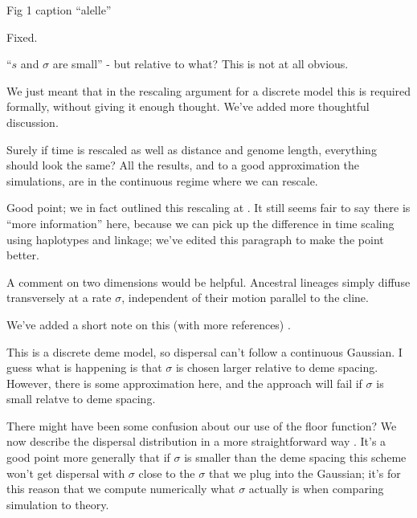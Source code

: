 \begin{point}{Fig 1 caption}
``alelle''
\end{point}

\reply
Fixed.

\begin{point}{\revref}
``$s$ and $\sigma$ are small'' - but relative to what?  This is not at all obvious.
\end{point}

\reply
We just meant that in the rescaling argument for a discrete model this is required formally,
without giving it enough thought.
We've added more thoughtful discussion.

\begin{point}{\revref}
Surely if time is rescaled as well as distance and genome length, everything should look the same?  
All the results, and to a good approximation the simulations, are in the continuous regime where we can rescale.
\end{point}

\reply
Good point; we in fact outlined this rescaling at .
It still seems fair to say there is ``more information'' here, because we can pick up the difference in time scaling
using haplotypes and linkage;
we've edited this paragraph to make the point better.

\begin{point}{}
A comment on two dimensions would be helpful.  
Ancestral lineages simply diffuse transversely at a rate $\sigma$, independent of their motion parallel to the cline.
\end{point}

\reply
We've added a short note on this (with more references) \revref.

\begin{point}{\revref}
This is a discrete deme model, so dispersal can't follow a continuous Gaussian. 
I guess what is happening is that $\sigma$ is chosen larger relative to deme spacing.  
However, there is some approximation here, and the approach will fail if $\sigma$ is small relatve to deme spacing.
\end{point}

\reply
There might have been some confusion about our use of the floor function?
We now describe the dispersal distribution in a more straightforward way \revref.
It's a good point more generally that if $\sigma$ is smaller than the deme spacing this scheme won't get dispersal with $\sigma$ close to the $\sigma$ that we plug into the Gaussian;
it's for this reason that we compute numerically what $\sigma$ actually is when comparing simulation to theory.

